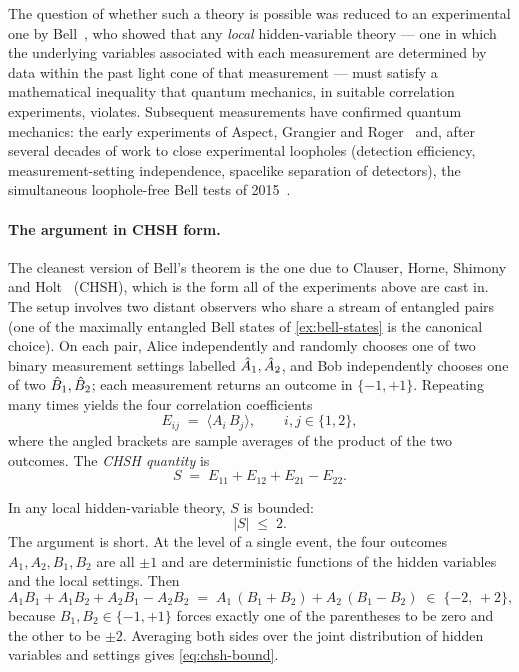 The question of whether such a theory is possible was reduced to an
experimental one by Bell~\cite{bell1964}, who showed that any
\emph{local} hidden-variable theory --- one in which the underlying
variables associated with each measurement are determined by data
within the past light cone of that measurement --- must satisfy a
mathematical inequality that quantum mechanics, in suitable
correlation experiments, violates. Subsequent measurements have
confirmed quantum mechanics: the early experiments of Aspect,
Grangier and Roger~\cite{aspect1982} and, after several decades of
work to close experimental loopholes (detection efficiency,
measurement-setting independence, spacelike separation of
detectors), the simultaneous loophole-free Bell tests of
2015~\cite{hensen2015,giustina2015,shalm2015}.

\paragraph{The argument in CHSH form.}
The cleanest version of Bell's theorem is the one due to Clauser,
Horne, Shimony and Holt~\cite{chsh1969} (CHSH), which is the form
all of the experiments above are cast in. The setup involves two
distant observers who share a stream of entangled pairs (one of the
maximally entangled Bell states of \cref{ex:bell-states} is the
canonical choice). On each pair, Alice independently and randomly
chooses one of two binary measurement settings labelled
$\hat{A}_1, \hat{A}_2$, and Bob independently chooses one of two
$\hat{B}_1, \hat{B}_2$; each measurement returns an outcome in
$\{-1, +1\}$. Repeating many times yields the four correlation
coefficients
\begin{equation}
E_{ij} \;=\; \langle A_i\,B_j\rangle,
\qquad i,j \in \{1,2\},
\end{equation}
where the angled brackets are sample averages of the product of the
two outcomes. The \emph{CHSH quantity} is
\begin{equation}
\label{eq:chsh}
S \;=\; E_{11} + E_{12} + E_{21} - E_{22}.
\end{equation}

In any local hidden-variable theory, $S$ is bounded:
\begin{equation}
\label{eq:chsh-bound}
|S| \;\leq\; 2.
\end{equation}
The argument is short. At the level of a single event, the four
outcomes $A_1, A_2, B_1, B_2$ are all $\pm 1$ and are deterministic
functions of the hidden variables and the local settings. Then
\begin{equation}
A_1 B_1 + A_1 B_2 + A_2 B_1 - A_2 B_2
\;=\; A_1\,(B_1 + B_2) + A_2\,(B_1 - B_2)
\;\in\; \{-2,\, +2\},
\end{equation}
because $B_1, B_2 \in \{-1, +1\}$ forces exactly one of the
parentheses to be zero and the other to be $\pm 2$. Averaging both
sides over the joint distribution of hidden variables and settings
gives \cref{eq:chsh-bound}.

